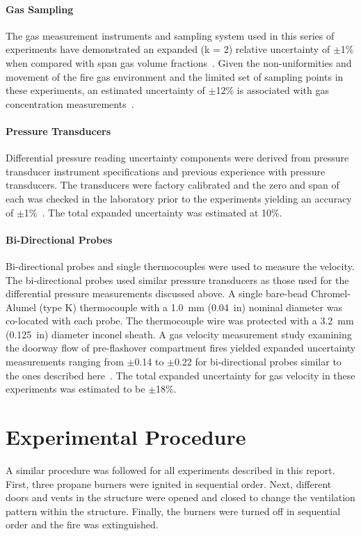 \documentclass[12pt,oneside]{book}
\begin{document}
\subsubsection{Gas Sampling}
The gas measurement instruments and sampling system used in this series of experiments have demonstrated an expanded (k = 2) relative uncertainty of $\pm$1\% when compared with span gas volume fractions~\cite{Bundy:2007}. Given the non-uniformities and movement of the fire gas environment and the limited set of sampling points in these experiments, an estimated uncertainty of $\pm$12\% is associated with gas concentration measurements~\cite{Lock:1}.

\subsubsection{Pressure Transducers}
Differential pressure reading uncertainty components were derived from pressure transducer instrument specifications and previous experience with pressure transducers. The transducers were factory calibrated and the zero and span of each was checked in the laboratory prior to the experiments yielding an accuracy of $\pm$1\%~\cite{Setra:2002}. The total expanded uncertainty was estimated at 10\%.

\subsubsection{Bi-Directional Probes}
Bi-directional probes and single thermocouples were used to measure the velocity. The bi-directional probes used similar pressure transducers as those used for the differential pressure measurements discussed above. A single bare-bead Chromel-Alumel (type K) thermocouple with a 1.0~mm (0.04~in) nominal diameter was co-located with each probe. The thermocouple wire was protected with a 3.2~mm (0.125~in) diameter inconel sheath. A gas velocity measurement study examining the doorway flow of pre-flashover compartment fires yielded expanded uncertainty measurements ranging from $\pm$0.14 to $\pm$0.22 for bi-directional probes similar to the ones described here~\cite{Bryant:FSJ2009}. The total expanded uncertainty for gas velocity in these experiments was estimated to be $\pm$18\%.

\clearpage

\chapter{Experimental Procedure}
\label{chap:Experimental_Procedure}
A similar procedure was followed for all experiments described in this report. First, three propane burners were ignited in sequential order. Next, different doors and vents in the structure were opened and closed to change the ventilation pattern within the structure. Finally, the burners were turned off in sequential order and the fire was extinguished.
\end{document}
